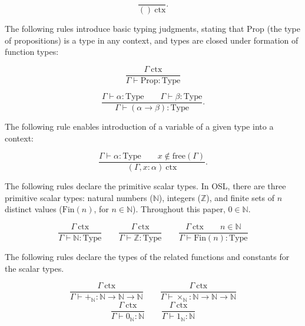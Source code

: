 \documentclass[11pt]{article}
\begin{document}
\begin{equation}
	\frac{}{()\ \text{ctx}}.
\end{equation}

The following rules introduce basic typing judgments, stating that
Prop (the type of propositions) is a type in any context, and
types are closed under formation of function types:

\begin{equation}
	\frac{\Gamma\ \text{ctx}}{\Gamma \vdash \text{Prop} : \text{Type}}
\end{equation}

\begin{equation}
	\frac{\Gamma \vdash \alpha : \text{Type} \qquad
	      \Gamma \vdash \beta : \text{Type}}
	      {\Gamma \vdash (\alpha \to \beta) : \text{Type}}.
\end{equation}

The following rule enables introduction of a variable of a given
type into a context:

\begin{equation}
	\frac{\Gamma \vdash \alpha : \text{Type}
	\qquad x \notin \text{free}(\Gamma)}
	{(\Gamma, x : \alpha)\ \text{ctx}}.
\end{equation}

The following rules declare the primitive scalar types.
In OSL, there are three primitive scalar types:
natural numbers ($\mathbb{N}$), integers ($\mathbb{Z}$),
and finite sets of $n$ distinct values ($\text{Fin}(n)$,
for $n \in \mathbb{N}$). Throughout this paper, $0 \in \mathbb{N}$.

\begin{equation}
	\frac{\Gamma\ \text{ctx}}{\Gamma \vdash \mathbb{N} : \text{Type}}
	\qquad
	\frac{\Gamma\ \text{ctx}}{\Gamma \vdash \mathbb{Z} : \text{Type}}
	\qquad
	\frac{\Gamma\ \text{ctx} \qquad n \in \mathbb{N}}{\Gamma \vdash \text{Fin}(n) : \text{Type}}
\end{equation}

The following rules declare the types of the related
functions and constants for the scalar types.

\begin{equation}
	\frac{\Gamma\ \text{ctx}}
	{\Gamma \vdash +_{\mathbb{N}} : \mathbb{N} \to \mathbb{N} \to \mathbb{N}}
	\qquad
	\frac{\Gamma\ \text{ctx}}
	{\Gamma \vdash \times_{\mathbb{N}} : \mathbb{N} \to \mathbb{N} \to \mathbb{N}}
\end{equation}
\begin{equation}
	\frac{\Gamma\ \text{ctx}}
	{\Gamma \vdash 0_{\mathbb{N}} : \mathbb{N}}
	\qquad
	\frac{\Gamma\ \text{ctx}}
	{\Gamma \vdash 1_{\mathbb{N}} : \mathbb{N}}
\end{equation}
\end{document}
